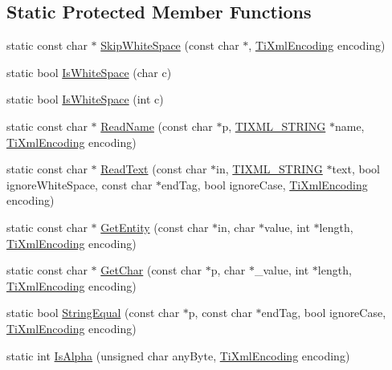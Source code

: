 \subsection*{Static Protected Member Functions}
\begin{DoxyCompactItemize}
\item 
static const char $\ast$ \hyperlink{class_ti_xml_base_ac0c3d66d8a9e6996a1fa016275e16875}{Skip\+White\+Space} (const char $\ast$, \hyperlink{tinyxml_8h_a88d51847a13ee0f4b4d320d03d2c4d96}{Ti\+Xml\+Encoding} encoding)
\item 
static bool \hyperlink{class_ti_xml_base_af56296d561c0bab4bc8e198cdcf5c48e}{Is\+White\+Space} (char c)
\item 
static bool \hyperlink{class_ti_xml_base_a3de391ea9f4c4a8aa10d04480b048795}{Is\+White\+Space} (int c)
\item 
static const char $\ast$ \hyperlink{class_ti_xml_base_a1c21a6ab5f7b503acd91f35f183734b3}{Read\+Name} (const char $\ast$p, \hyperlink{tinyxml_8h_a92bada05fd84d9a0c9a5bbe53de26887}{T\+I\+X\+M\+L\+\_\+\+S\+T\+R\+I\+NG} $\ast$name, \hyperlink{tinyxml_8h_a88d51847a13ee0f4b4d320d03d2c4d96}{Ti\+Xml\+Encoding} encoding)
\item 
static const char $\ast$ \hyperlink{class_ti_xml_base_aa646c74921aa33156968b802bbf5566e}{Read\+Text} (const char $\ast$in, \hyperlink{tinyxml_8h_a92bada05fd84d9a0c9a5bbe53de26887}{T\+I\+X\+M\+L\+\_\+\+S\+T\+R\+I\+NG} $\ast$text, bool ignore\+White\+Space, const char $\ast$end\+Tag, bool ignore\+Case, \hyperlink{tinyxml_8h_a88d51847a13ee0f4b4d320d03d2c4d96}{Ti\+Xml\+Encoding} encoding)
\item 
static const char $\ast$ \hyperlink{class_ti_xml_base_ac5c08bf3deffcda0bf8ce2958372b584}{Get\+Entity} (const char $\ast$in, char $\ast$value, int $\ast$length, \hyperlink{tinyxml_8h_a88d51847a13ee0f4b4d320d03d2c4d96}{Ti\+Xml\+Encoding} encoding)
\item 
static const char $\ast$ \hyperlink{class_ti_xml_base_a5b0fde72d6f662ae1fd6303195d2159b}{Get\+Char} (const char $\ast$p, char $\ast$\+\_\+value, int $\ast$length, \hyperlink{tinyxml_8h_a88d51847a13ee0f4b4d320d03d2c4d96}{Ti\+Xml\+Encoding} encoding)
\item 
static bool \hyperlink{class_ti_xml_base_a51631e6986179558b9e5850723ed165a}{String\+Equal} (const char $\ast$p, const char $\ast$end\+Tag, bool ignore\+Case, \hyperlink{tinyxml_8h_a88d51847a13ee0f4b4d320d03d2c4d96}{Ti\+Xml\+Encoding} encoding)
\item 
static int \hyperlink{class_ti_xml_base_ae22522b2e8e1ac43102d16394f639fc8}{Is\+Alpha} (unsigned char any\+Byte, \hyperlink{tinyxml_8h_a88d51847a13ee0f4b4d320d03d2c4d96}{Ti\+Xml\+Encoding} encoding)

\end{DoxyCompactItemize}
